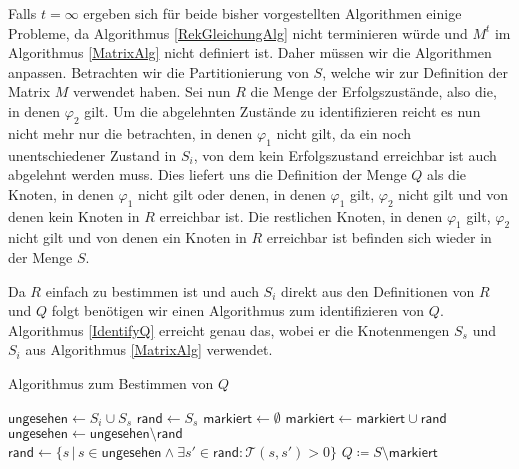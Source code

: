 \documentclass{lni}
\theoremstyle{def_style}
\theoremstyle{break}
\begin{document}

Falls $t=\infty$ ergeben sich für beide bisher vorgestellten Algorithmen einige Probleme, da Algorithmus \ref{RekGleichungAlg} nicht terminieren würde und $M^t$ im Algorithmus \ref{MatrixAlg} nicht definiert ist.
Daher müssen wir die Algorithmen anpassen. Betrachten wir die Partitionierung von $S$, welche wir zur Definition der Matrix $M$ verwendet haben. 
Sei nun $R$ die Menge der Erfolgszustände, also die, in denen $\varphi_2$ gilt. 
Um die abgelehnten Zustände zu identifizieren reicht es nun nicht mehr nur die betrachten, in denen $\varphi_1$ nicht gilt, da ein noch unentschiedener Zustand in $S_i$, von dem kein Erfolgszustand erreichbar ist auch abgelehnt werden muss.
Dies liefert uns die Definition der Menge $Q$ als die Knoten, in denen $\varphi_1$ nicht gilt oder denen, in denen $\varphi_1$ gilt, $\varphi_2$ nicht gilt und von denen kein Knoten in $R$ erreichbar ist.
Die restlichen Knoten, in denen $\varphi_1$ gilt, $\varphi_2$ nicht gilt und von denen ein Knoten in $R$ erreichbar ist befinden sich wieder in der Menge $S$. \cite{hansson1994logic}

Da $R$ einfach zu bestimmen ist und auch $S_i$ direkt aus den Definitionen von $R$ und $Q$ folgt benötigen wir einen Algorithmus zum identifizieren von $Q$. Algorithmus \ref{IdentifyQ} erreicht genau das, wobei er die Knotenmengen $S_s$ und $S_i$ aus Algorithmus \ref{MatrixAlg} verwendet.

\begin{algorithm}[h]
	\caption{Algorithmus zum Bestimmen von $Q$ \cite{hansson1994logic}}
	\label{IdentifyQ}
	\begin{algorithmic}
		\State $\mathsf{ungesehen} \gets S_i \cup S_s$
		\State $\mathsf{rand} \gets S_s$
		\State $\mathsf{markiert} \gets \emptyset$
			\State $\mathsf{markiert} \gets \mathsf{markiert}\cup \mathsf{rand}$
			\State $\mathsf{ungesehen} \gets \mathsf{ungesehen} \setminus \mathsf{rand}$
			\State $\mathsf{rand} \gets \{s \, | \, s\in \mathsf{ungesehen} \land \exists s'\in \mathsf{rand}:\mathcal{T}(s,s')>0\}$
		\EndFor
		\State $Q\coloneqq S \setminus \mathsf{markiert}$
	\end{algorithmic}
\end{algorithm}
\end{document}
